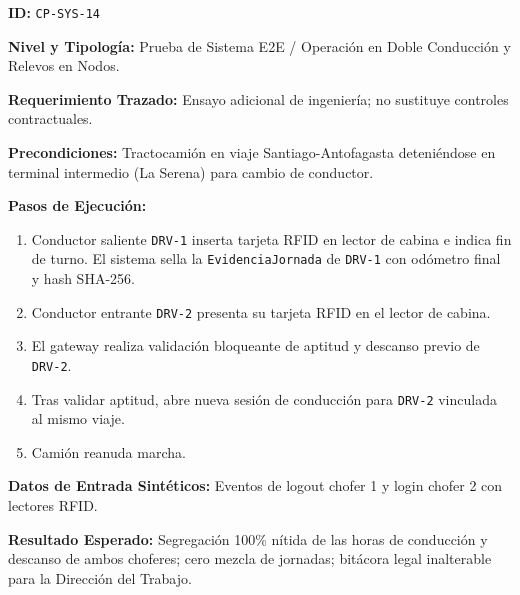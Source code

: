\par\noindent\textbf{ID:} \texttt{C\allowbreak{}P\allowbreak{}-\allowbreak{}S\allowbreak{}Y\allowbreak{}S\allowbreak{}-\allowbreak{}1\allowbreak{}4\allowbreak{}}\par
\par\noindent\textbf{Nivel y Tipología:} Prueba de Sistema E2E / Operación en Doble Conducción y Relevos en Nodos.\par
\par\noindent\textbf{Requerimiento Trazado:} Ensayo adicional de ingeniería; no sustituye controles contractuales.\par
\par\noindent\textbf{Precondiciones:} Tractocamión en viaje Santiago-Antofagasta deteniéndose en terminal intermedio (La Serena) para cambio de conductor.\par
\par\noindent\textbf{Pasos de Ejecución:} \par
\begin{enumerate}
\item Conductor saliente \texttt{D\allowbreak{}R\allowbreak{}V\allowbreak{}-\allowbreak{}1\allowbreak{}} inserta tarjeta RFID en lector de cabina e indica fin de turno. El sistema sella la \texttt{E\allowbreak{}v\allowbreak{}i\allowbreak{}d\allowbreak{}e\allowbreak{}n\allowbreak{}c\allowbreak{}i\allowbreak{}a\allowbreak{}J\allowbreak{}o\allowbreak{}r\allowbreak{}n\allowbreak{}a\allowbreak{}d\allowbreak{}a\allowbreak{}} de \texttt{D\allowbreak{}R\allowbreak{}V\allowbreak{}-\allowbreak{}1\allowbreak{}} con odómetro final y hash SHA-256.
\item Conductor entrante \texttt{D\allowbreak{}R\allowbreak{}V\allowbreak{}-\allowbreak{}2\allowbreak{}} presenta su tarjeta RFID en el lector de cabina.
\item El gateway realiza validación bloqueante de aptitud y descanso previo de \texttt{D\allowbreak{}R\allowbreak{}V\allowbreak{}-\allowbreak{}2\allowbreak{}}.
\item Tras validar aptitud, abre nueva sesión de conducción para \texttt{D\allowbreak{}R\allowbreak{}V\allowbreak{}-\allowbreak{}2\allowbreak{}} vinculada al mismo viaje.
\item Camión reanuda marcha.
\end{enumerate}
\par\noindent\textbf{Datos de Entrada Sintéticos:} Eventos de logout chofer 1 y login chofer 2 con lectores RFID.\par
\par\noindent\textbf{Resultado Esperado:} Segregación 100\% nítida de las horas de conducción y descanso de ambos choferes; cero mezcla de jornadas; bitácora legal inalterable para la Dirección del Trabajo.\par
